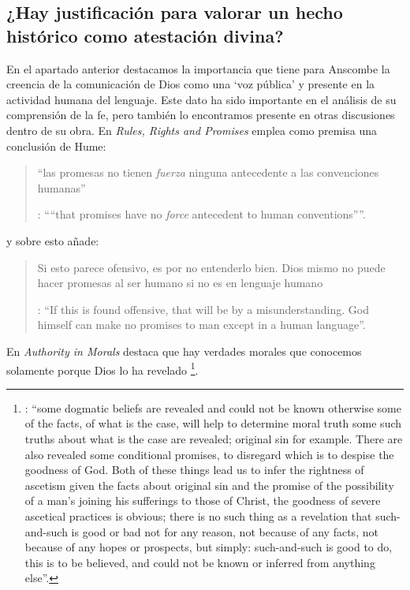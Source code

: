 \subsection{¿Hay justificación para valorar un hecho histórico como atestación divina?}

En el apartado anterior destacamos la importancia que tiene para Anscombe la creencia de la comunicación de Dios como una `voz pública' y presente en la actividad humana del lenguaje. Este dato ha sido importante en el análisis de su comprensión de la fe, pero también lo encontramos presente en otras discusiones dentro de su obra. En \emph{Rules, Rights and Promises} emplea como premisa una conclusión de Hume: \blockquote[{\Cite[99]{anscombe1981erp:rrp}}: \enquote{``that promises have no \emph{force} antecedent to human conventions''}.]{``las promesas no tienen \emph{fuerza} ninguna antecedente a las convenciones humanas''} y sobre esto añade: \blockquote[{\Cite[99]{anscombe1981erp:rrp}}: \enquote{If this is found offensive, that will be by a misunderstanding. God himself can make no promises to man except in a human language}.]{Si esto parece ofensivo, es por no entenderlo bien. Dios mismo no puede hacer promesas al ser humano si no es en lenguaje humano}. En \emph{Authority in Morals} destaca que hay verdades morales que conocemos solamente porque Dios lo ha revelado
\footnote{\cite[48-49]{anscombe1981erp:am}: \enquote{some dogmatic beliefs are revealed and could not be known otherwise \textelp{} some of the facts, of what is the case, will help to determine moral truth \textelp{} some such truths about what is the case are revealed; original sin for example. There are also revealed some conditional promises, to disregard which is to despise the goodness of God. Both of these things lead us to infer the rightness of ascetism \textelp{} given the facts about original sin and the promise of the possibility of a man's joining his sufferings to those of Christ, the goodness of severe ascetical practices \textelp{} is obvious; there is no such thing as a revelation that such-and-such is good or bad not for any reason, not because of any facts, not because of any hopes or prospects, but simply: such-and-such is good to do, this is to be believed, and could not be known or inferred from anything else}.}.
